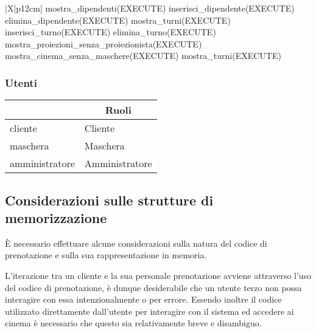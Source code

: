 \begin{tabularx}{\linewidth}{|X|p{12cm}|}
    mostra\_dipendenti(EXECUTE) \linebreak
    inserisci\_dipendente(EXECUTE) \linebreak
    elimina\_dipendente(EXECUTE) \linebreak
    mostra\_turni(EXECUTE) \linebreak
    inserisci\_turno(EXECUTE) \linebreak
    elimina\_turno(EXECUTE) \linebreak
    mostra\_proiezioni\_senza\_proiezionista(EXECUTE) \linebreak
    mostra\_cinema\_senza\_maschere(EXECUTE) \linebreak
    mostra\_turni(EXECUTE)
    \\\hline
\end{tabularx}

\subsubsection*{Utenti}

\begin{tabularx}{\linewidth}{|X|X|}
    \hline
    \rowcolor{tblhdrcolor}
    \multicolumn{1}{|c|}{\textbf{Nome}}
                   & \multicolumn{1}{|c|}{\textbf{Ruoli}}
    \\\hline
    cliente        & Cliente                              \\\hline
    maschera       & Maschera                             \\\hline
    amministratore & Amministratore                       \\\hline
\end{tabularx}

\pagebreak

\subsection*{Considerazioni sulle strutture di memorizzazione}

È necessario effettuare alcune considerazioni sulla natura del codice di
prenotazione e sulla sua rappresentazione in memoria.

L'iterazione tra un cliente e la sua personale prenotazione avviene attraverso
l'uso del codice di prenotazione, è dunque desiderabile che un utente terzo non
possa interagire con essa intenzionalmente o per errore. Essendo inoltre
il codice utilizzato direttamente dall'utente per interagire con il sistema
ed accedere ai cinema è necessario che questo sia relativamente breve e
disambiguo.

